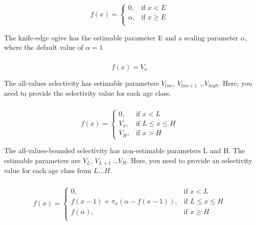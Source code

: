 \begin{equation}
f(x)= \begin{cases}
  0, & \text{if $x < E$} \\
  \alpha, & \text{if $x \ge E$}\\ 
  \end{cases} 
\end{equation}

The knife-edge ogive has the estimable parameter E and a scaling parameter $\alpha$, where the default value of $\alpha = 1$

\subsubsection[All-values]{}

\begin{equation}
f(x)=V_x
\end{equation}

The all-values selectivity has estimable parameters $V_{low}$, $V_{low+1}$ \ldots $V_{high}$. Here, you need to provide the selectivity value for each age class.

\subsubsection[All-values-bounded]{}

\begin{equation}
f(x)=\begin{cases}
		 0, & \text{if $x < L$} \\
		 V_x, & \text{if $L \le x \le H$} \\
		 V_H, & \text{if $x > H$}
  \end{cases}
\end{equation}

The all-values-bounded selectivity has non-estimable parameters L and H. The estimable parameters are $V_L$, $V_{L+1}$ \ldots $V_H$. Here, you need to provide an selectivity value for each age class from $L \ldots H$.

\subsubsection[Increasing]{}

\begin{equation} 
f(x)=\begin{cases}
	  0, & \text{if $x < L$} \\
	  f(x-1)+ \pi_x(\alpha-f(x-1)), & \text{if $L \le x \le H$} \\
	  f(\alpha), & \text{if $x \ge H$} \\  
  \end{cases}
\end{equation}

